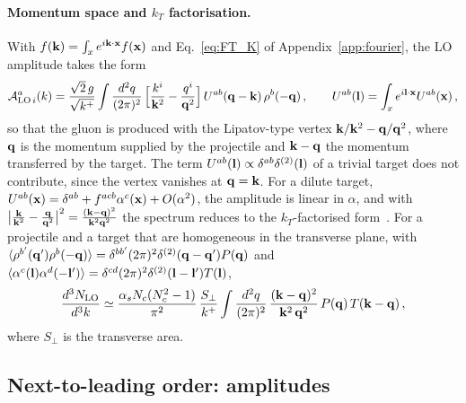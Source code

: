 \paragraph{Momentum space and $k_T$ factorisation.} With $f(\mathbf{k})=\int_xe^{i\mathbf{k}\cdot\mathbf{x}}f(\mathbf{x})$ and Eq.~\eqref{eq:FT_K} of Appendix~\ref{app:fourier}, the LO amplitude takes the form
\begin{align}\label{eq:ALOmom}
\mathcal A^{a}_{{\rm LO}\,i}(k)=\frac{\sqrt2\,g}{\sqrt{k^+}}\int\frac{d^2q}{(2\pi)^2}\,\Big[\frac{k^i}{\mathbf{k}^2}-\frac{q^i}{\mathbf{q}^2}\Big]\,U^{ab}(\mathbf{q}-\mathbf{k})\,\rho^b(-\mathbf{q})\,,\qquad
U^{ab}(\mathbf{l})=\int_xe^{i\mathbf{l}\cdot\mathbf{x}}U^{ab}(\mathbf{x})\,,
\end{align}
so that the gluon is produced with the Lipatov-type vertex $\mathbf{k}/\mathbf{k}^2-\mathbf{q}/\mathbf{q}^2$, where $\mathbf{q}$ is the momentum supplied by the projectile and $\mathbf{k}-\mathbf{q}$ the momentum transferred by the target. The term $U^{ab}(\mathbf{l})\propto\delta^{ab}\delta^{(2)}(\mathbf{l})$ of a trivial target does not contribute, since the vertex vanishes at $\mathbf{q}=\mathbf{k}$. For a dilute target, $U^{ab}(\mathbf{x})=\delta^{ab}+f^{acb}\alpha^c(\mathbf{x})+O(\alpha^2)$, the amplitude is linear in $\alpha$, and with $\big|\frac{\mathbf{k}}{\mathbf{k}^2}-\frac{\mathbf{q}}{\mathbf{q}^2}\big|^2=\frac{(\mathbf{k}-\mathbf{q})^2}{\mathbf{k}^2\mathbf{q}^2}$ the spectrum reduces to the $k_T$-factorised form~\cite{Gribov:1983ivg,Kovchegov:2001sc,Kharzeev:2003wz,Blaizot:2004wu}. For a projectile and a target that are homogeneous in the transverse plane, with $\langle\rho^{b'}(\mathbf{q}')\rho^b(-\mathbf{q})\rangle=\delta^{bb'}(2\pi)^2\delta^{(2)}(\mathbf{q}-\mathbf{q}')P(\mathbf{q})$ and $\langle\alpha^{c}(\mathbf{l})\alpha^{d}(-\mathbf{l}')\rangle=\delta^{cd}(2\pi)^2\delta^{(2)}(\mathbf{l}-\mathbf{l}')T(\mathbf{l})$,
\begin{align}\label{eq:kTfact}
\frac{d^3N_{\rm LO}}{d^3k}\simeq\frac{\alpha_s N_c(N_c^2-1)}{\pi^2}\,\frac{S_\perp}{k^+}\int\frac{d^2q}{(2\pi)^2}\,\frac{(\mathbf{k}-\mathbf{q})^2}{\mathbf{k}^2\,\mathbf{q}^2}\,P(\mathbf{q})\,T(\mathbf{k}-\mathbf{q})\,,
\end{align}
where $S_\perp$ is the transverse area.

\subsection{Next-to-leading order: amplitudes}\label{sec:NLOamplitudes}

